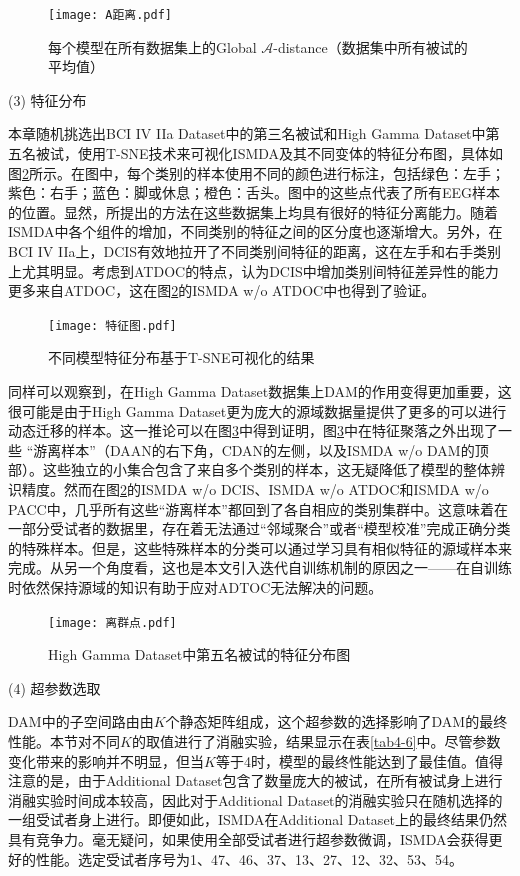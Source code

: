 \begin{figure}[!t]
\centering
\texttt{[image: A距离.pdf]}
\caption{每个模型在所有数据集上的Global $\mathcal{A}$-distance（数据集中所有被试的平均值）}
\label{fig_4_5}
\end{figure}

(3) 特征分布

本章随机挑选出BCI IV IIa Dataset中的第三名被试和High Gamma Dataset中第五名被试，使用T-SNE技术\cite{4-26}来可视化ISMDA及其不同变体的特征分布图，具体如图\ref{fig_4_6}所示。在图中，每个类别的样本使用不同的颜色进行标注，包括绿色：左手；紫色：右手；蓝色：脚或休息；橙色：舌头。图中的这些点代表了所有EEG样本的位置。显然，所提出的方法在这些数据集上均具有很好的特征分离能力。随着ISMDA中各个组件的增加，不同类别的特征之间的区分度也逐渐增大。另外，在BCI IV IIa上，DCIS有效地拉开了不同类别间特征的距离，这在左手和右手类别上尤其明显。考虑到ATDOC的特点，认为DCIS中增加类别间特征差异性的能力更多来自ATDOC，这在图\ref{fig_4_6}的ISMDA w/o ATDOC中也得到了验证。

\begin{figure}[!t]
\centering
\texttt{[image: 特征图.pdf]}
\caption{不同模型特征分布基于T-SNE可视化的结果}
\label{fig_4_6}
\end{figure}

同样可以观察到，在High Gamma Dataset数据集上DAM的作用变得更加重要，这很可能是由于High Gamma Dataset更为庞大的源域数据量提供了更多的可以进行动态迁移的样本。这一推论可以在图\ref{fig_4_7}中得到证明，图\ref{fig_4_7}中在特征聚落之外出现了一些 “游离样本”（DAAN的右下角，CDAN的左侧，以及ISMDA w/o DAM的顶部）。这些独立的小集合包含了来自多个类别的样本，这无疑降低了模型的整体辨识精度。然而在图\ref{fig_4_6}的ISMDA w/o DCIS、ISMDA w/o ATDOC和ISMDA w/o PACC中，几乎所有这些“游离样本”都回到了各自相应的类别集群中。这意味着在一部分受试者的数据里，存在着无法通过“邻域聚合”或者“模型校准”完成正确分类的特殊样本。但是，这些特殊样本的分类可以通过学习具有相似特征的源域样本来完成。从另一个角度看，这也是本文引入迭代自训练机制的原因之一——在自训练时依然保持源域的知识有助于应对ADTOC无法解决的问题。
\begin{figure}[!h]
\centering
\texttt{[image: 离群点.pdf]}
\caption{High Gamma Dataset中第五名被试的特征分布图}
\label{fig_4_7}
\end{figure}

(4) 超参数选取

DAM中的子空间路由由$K$个静态矩阵组成，这个超参数的选择影响了DAM的最终性能。本节对不同$K$的取值进行了消融实验，结果显示在表\ref{tab4-6}中。尽管参数变化带来的影响并不明显，但当$K$等于4时，模型的最终性能达到了最佳值。值得注意的是，由于Additional Dataset包含了数量庞大的被试，在所有被试身上进行消融实验时间成本较高，因此对于Additional Dataset的消融实验只在随机选择的一组受试者身上进行。即便如此，ISMDA在Additional Dataset上的最终结果仍然具有竞争力。毫无疑问，如果使用全部受试者进行超参数微调，ISMDA会获得更好的性能。选定受试者序号为1、47、46、37、13、27、12、32、53、54。


